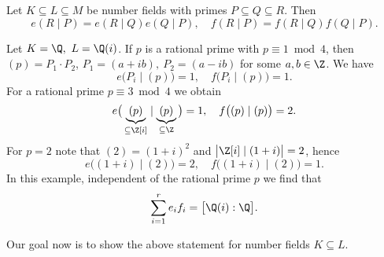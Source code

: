 \begin{rem*}
	Let \( K \subseteq L \subseteq M \) be number fields with primes \( P \subseteq Q \subseteq R \).
	Then
	\[ e(R \mid P) = e(R \mid Q) e(Q \mid P),\quad f(R \mid P) = f(R \mid Q) f(Q \mid P). \]
\end{rem*}

\begin{exmp*}
	Let \( K = \Q,\ L = \Q(i) \).
	If \( p \) is a rational prime with \( p \equiv 1 \bmod 4 \), then \( (p) = P_1 \cdot P_2 \), \( P_1 = (a+ib),\ P_2 = (a-ib) \) for some \( a,b \in \Z \). We have
	\[ e\big(P_i \mid (p)\big) = 1, \quad f\big(P_i \mid (p)\big) = 1. \]
	For a rational prime \( p \equiv 3 \bmod 4 \) we obtain
	\[ e\big( \underbrace{(p)}_{\subseteq \Z[i]} \mid \underbrace{(p)}_{\subseteq \Z} \big) = 1, \quad f\big((p) \mid (p)\big) = 2. \]
	For \( p=2 \) note that \( (2) = (1+i)^2 \) and \( \big| \Z[i] \mid (1+i) \big| = 2 \), hence
	\[ e\big( (1+i) \mid (2)\big) = 2, \quad f\big((1+i) \mid (2)\big) = 1. \]
	In this example, independent of the rational prime \( p \) we find that
	\[ \sum_{i=1}^{r} e_if_i = \big[\Q(i) : \Q\big]. \]
\end{exmp*}

Our goal now is to show the above statement for number fields \( K \subseteq L \).